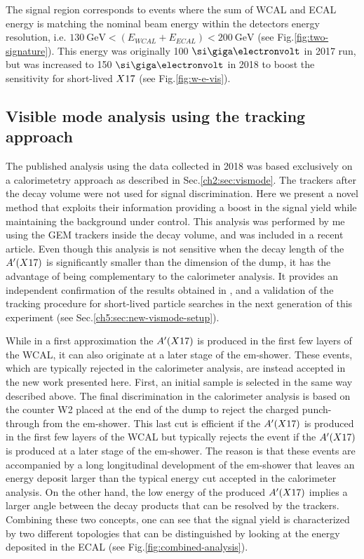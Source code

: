 The signal region corresponds to events where the sum of WCAL and ECAL energy is matching the nominal beam energy within the detectors energy resolution, i.e. $\SI{130}{\giga\electronvolt} < (E_{WCAL} + E_{ECAL}) < \SI{200}{\giga\electronvolt}$ (see Fig.\ref{fig:two-signature}). This energy was originally 100 $\gev$ in 2017 run, but was increased to 150 $\gev$ in 2018 to boost the sensitivity for short-lived $X17$ (see Fig.\ref{fig:w-e-vis}).

\subsection{Visible mode analysis using the tracking approach}
\label{ch3:sec:vis-mode-tracking}

The published analysis using the data collected in 2018 \cite{Banerjee:2019hmi} was based exclusively on a calorimetetry approach as described in Sec.\ref{ch2:sec:vismode}. The trackers after the decay volume were not used for signal discrimination. Here we present a novel method that exploits their information providing a boost in the signal yield while maintaining the background under control. This analysis was performed by me using the GEM trackers inside the decay volume, and was included in a recent article. Even though this analysis is not sensitive when the decay length of the $A'(X17)$ is significantly smaller than the dimension of the dump, it has the advantage of being complementary to the calorimeter analysis. It provides an independent confirmation of the results obtained in \cite{Banerjee:2019hmi}, and a validation of the tracking procedure for short-lived particle searches in the next generation of this experiment (see Sec.\ref{ch5:sec:new-vismode-setup}).

While in a first approximation the $A'(X17)$ is produced in the first few layers of the WCAL, it can also originate at a later stage of the em-shower. These events, which are typically rejected in the calorimeter analysis, are instead accepted in the new work presented here. First, an initial sample is selected in the same way described above. The final discrimination in the calorimeter analysis is based on the counter W2 placed at the end of the dump to reject the charged punch-through from the em-shower. This last cut is efficient if the $A'(X17)$ is produced in the first few layers of the WCAL but typically rejects the event if the $A'(X17)$ is produced at a later stage of the em-shower. The reason is that these events are accompanied by a long longitudinal development of the em-shower that leaves an energy deposit larger than the typical energy cut accepted in the calorimeter analysis. On the other hand, the low energy of the produced $A'(X17)$ implies a larger angle between the decay products that can be resolved by the trackers. Combining these two concepts, one can see that the signal yield is characterized by two different topologies that can be distinguished by looking at the energy deposited in the ECAL (see Fig.\ref{fig:combined-analysis}).

